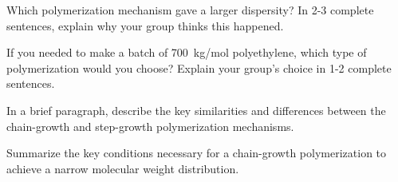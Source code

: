 \begin{activity}
\begin{ctqs}
		\begin{solution}[1.75in]
		\end{solution}
	
	\question Which polymerization mechanism gave a larger dispersity?  In 2-3 complete sentences, explain why your group thinks this happened.
	
		\begin{solution}[1.75in]
		\end{solution}
	
	\question If you needed to make a batch of 700~kg/mol polyethylene, which type of polymerization would you choose?  Explain your group's choice in 1-2 complete sentences.
	
		\begin{solution}[1.75in]
		\end{solution}
	
\end{ctqs}

\begin{exercises}

		\exercise In a brief paragraph, describe the key similarities and differences between the chain-growth and step-growth polymerization mechanisms.
		
		\exercise Summarize the key conditions necessary for a chain-growth polymerization to achieve a narrow molecular weight distribution.
			
\end{exercises}
	
\end{activity}